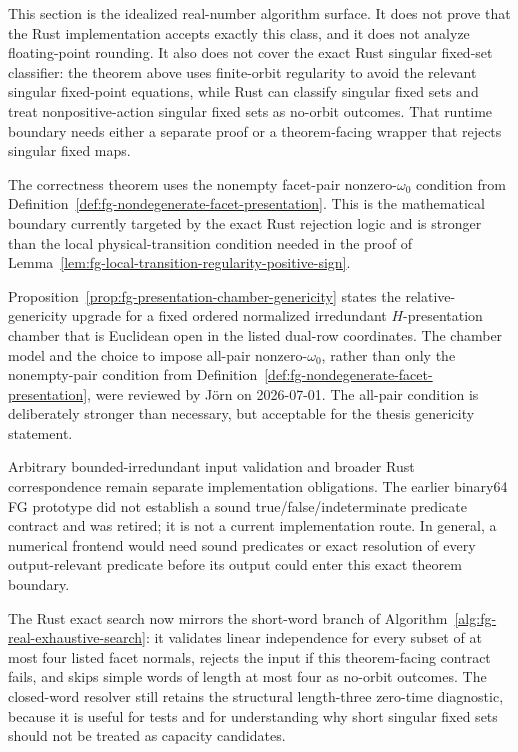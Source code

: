 \begin{remark}%
\label{rem:fg-real-missing-work}
This section is the idealized real-number algorithm surface.  It does not
prove that the Rust implementation accepts exactly this class, and it does
not analyze floating-point rounding.  It also does not cover the exact Rust singular
fixed-set classifier: the theorem above uses finite-orbit regularity to avoid
the relevant singular fixed-point equations, while Rust can classify singular
fixed sets and treat nonpositive-action singular fixed sets as no-orbit
outcomes.  That runtime boundary needs either a separate proof or a
theorem-facing wrapper that rejects singular fixed maps.

The correctness theorem uses the nonempty facet-pair nonzero-\(\omega_0\)
condition from
Definition~\ref{def:fg-nondegenerate-facet-presentation}.  This is the
mathematical boundary currently targeted by the exact Rust rejection logic and
is stronger than the local physical-transition condition needed in the proof of
Lemma~\ref{lem:fg-local-transition-regularity-positive-sign}.

Proposition~\ref{prop:fg-presentation-chamber-genericity} states the
relative-genericity upgrade for a fixed ordered normalized irredundant
\(H\)-presentation chamber that is Euclidean open in the listed dual-row
coordinates.  The chamber model and the choice to impose all-pair
nonzero-\(\omega_0\), rather than only the nonempty-pair condition from
Definition~\ref{def:fg-nondegenerate-facet-presentation}, were reviewed by
Jörn on 2026-07-01.  The all-pair condition is deliberately stronger than
necessary, but acceptable for the thesis genericity statement.

Arbitrary bounded-irredundant input validation and broader Rust correspondence
remain separate implementation obligations. The earlier binary64 FG prototype
did not establish a sound true/false/indeterminate predicate contract and was
retired; it is not a current implementation route. In general, a numerical
frontend would need sound predicates or exact resolution of every
output-relevant predicate before its output could enter this exact theorem
boundary.

The Rust exact search now mirrors the short-word branch of
Algorithm~\ref{alg:fg-real-exhaustive-search}: it validates linear
independence for every subset of at most four listed facet normals, rejects the
input if this theorem-facing contract fails, and skips simple words of length
at most four as no-orbit outcomes.  The closed-word resolver still retains the
structural length-three zero-time diagnostic, because it is useful for tests
and for understanding why short singular fixed sets should not be treated as
capacity candidates.
\end{remark}
